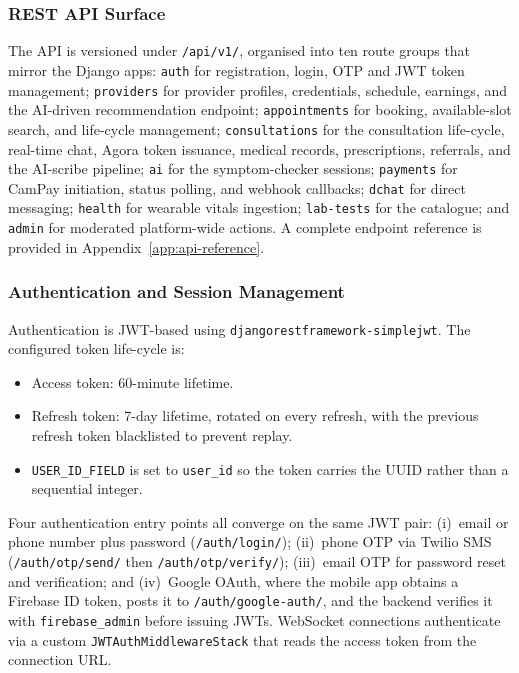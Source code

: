 \subsubsection*{REST API Surface}

The API is versioned under \texttt{/api/v1/}, organised into ten route groups that mirror the Django apps: \texttt{auth} for registration, login, OTP and JWT token management; \texttt{providers} for provider profiles, credentials, schedule, earnings, and the AI-driven recommendation endpoint; \texttt{appointments} for booking, available-slot search, and life-cycle management; \texttt{consultations} for the consultation life-cycle, real-time chat, Agora token issuance, medical records, prescriptions, referrals, and the AI-scribe pipeline; \texttt{ai} for the symptom-checker sessions; \texttt{payments} for CamPay initiation, status polling, and webhook callbacks; \texttt{dchat} for direct messaging; \texttt{health} for wearable vitals ingestion; \texttt{lab-tests} for the catalogue; and \texttt{admin} for moderated platform-wide actions. A complete endpoint reference is provided in Appendix~\ref{app:api-reference}.

\subsubsection*{Authentication and Session Management}

Authentication is JWT-based using \texttt{djangorestframework-simplejwt}. The configured token life-cycle is:

\begin{itemize}
  \item Access token: 60-minute lifetime.
  \item Refresh token: 7-day lifetime, rotated on every refresh, with the previous refresh token blacklisted to prevent replay.
  \item \texttt{USER\_ID\_FIELD} is set to \texttt{user\_id} so the token carries the UUID rather than a sequential integer.
\end{itemize}

Four authentication entry points all converge on the same JWT pair: (i)~email or phone number plus password (\texttt{/auth/login/}); (ii)~phone OTP via Twilio SMS (\texttt{/auth/otp/send/} then \texttt{/auth/otp/verify/}); (iii)~email OTP for password reset and verification; and (iv)~Google OAuth, where the mobile app obtains a Firebase ID token, posts it to \texttt{/auth/google-auth/}, and the backend verifies it with \texttt{firebase\_admin} before issuing JWTs. WebSocket connections authenticate via a custom \texttt{JWTAuthMiddlewareStack} that reads the access token from the connection URL.

